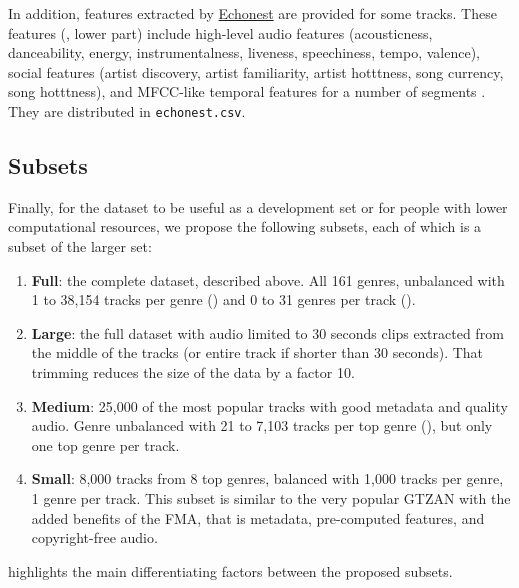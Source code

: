 \documentclass{article}
\newcommand{\ngenres}{161 }
\begin{document}
In addition,
features extracted by \href{http://the.echonest.com/}{Echonest} are provided for some tracks. These features (, lower part) include high-level audio features (acousticness, danceability, energy, instrumentalness, liveness, speechiness, tempo, valence), social features (artist discovery, artist familiarity, artist hotttness, song currency, song hotttness), and MFCC-like temporal features for a number of segments \cite{echonest_temporal}. They are distributed in \texttt{echonest.csv}.

\subsection{Subsets} \label{sec:subsets}

Finally, for the dataset to be useful as a development set or for people with lower computational resources, we propose the following subsets, each of which is a subset of the larger set:
\begin{enumerate}
	\item \textbf{Full}: the complete dataset, described above. All \ngenres genres, unbalanced with 1 to 38,154 tracks per genre () and 0 to 31 genres per track ().
	\item \textbf{Large}: the full dataset with audio limited to 30 seconds clips extracted from the middle of the tracks (or entire track if shorter than 30 seconds). That trimming reduces the size of the data by a factor 10.
	\item \textbf{Medium}: 25,000 of the most popular tracks with good metadata and quality audio. Genre unbalanced with 21 to 7,103 tracks per top genre (), but only one top genre per track.
	\item \textbf{Small}: 8,000 tracks from 8 top genres, balanced with 1,000 tracks per genre, 1 genre per track. This subset is similar to the very popular GTZAN \cite{gtzan} with the added benefits of the FMA, that is metadata, pre-computed features, and copyright-free audio.
\end{enumerate}
 highlights the main differentiating factors between the proposed subsets.
\end{document}
